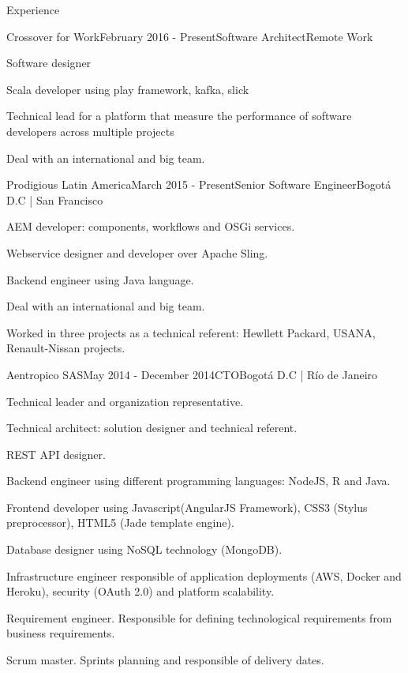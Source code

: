 \documentclass[spanish]{resume}
\begin{document}
\begin{rSection}{Experience}


\begin{rSubsection}{Crossover for Work}{February 2016 - Present}{Software Architect}{Remote Work}
\item Software designer
\item Scala developer using play framework, kafka, slick
\item Technical lead for a platform that measure the performance of software developers across multiple projects 
\item Deal with an international and big team.
\end{rSubsection}


\begin{rSubsection}{Prodigious Latin America}{March 2015 - Present}{Senior Software Engineer}{Bogot\'a D.C | San Francisco}
\item AEM developer: components, workflows and OSGi services.
\item Webservice designer and developer over Apache Sling.  
\item Backend engineer using Java language.
\item Deal with an international and big team.
\item Worked in three projects as a technical referent: Hewllett Packard, USANA, Renault-Nissan projects.
\end{rSubsection}


\begin{rSubsection}{Aentropico SAS}{May 2014 - December 2014}{CTO}{Bogot\'a D.C | R\'io de Janeiro}
\item Technical leader and organization representative.
\item Technical architect: solution designer and technical referent.
\item REST API designer.
\item Backend engineer using different programming languages: NodeJS, R and Java.
\item Frontend developer using Javascript(AngularJS Framework), CSS3 (Stylus preprocessor), HTML5 (Jade template engine).
\item Database designer using NoSQL technology (MongoDB).
\item Infrastructure engineer responsible of application deployments (AWS, Docker and Heroku), security (OAuth 2.0) and platform scalability.
\item Requirement engineer. Responsible for defining technological requirements from business requirements.
\item Scrum master. Sprints planning and responsible of delivery dates.
\end{rSubsection}


\end{rSection}
\end{document}
